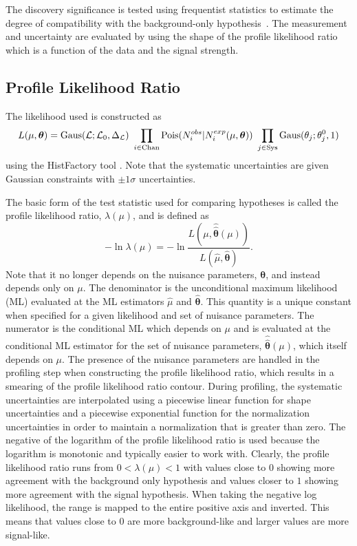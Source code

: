 The discovery significance is tested using frequentist statistics
to estimate the degree of compatibility with the background-only 
hypothesis~\cite{Cowan:1277304}.
The measurement and uncertainty are evaluated 
by using the shape of the profile likelihood ratio~\cite{PDG:2014} 
which is a function of the data and the signal strength.

\subsection{Profile Likelihood Ratio}

The likelihood used is constructed as
\begin{equation}
L(\mu,\boldsymbol{\theta}) = \mathrm{Gaus}(\mathcal{L};\mathcal{L}_0,\Delta_{\mathcal{L}})~\prod_{i\in\mathrm{Chan}} \mathrm{Pois}(N_i^{obs}|N_i^{exp}(\mu,\boldsymbol{\theta}))~\prod_{j\in\mathrm{Sys}} \mathrm{Gaus}(\theta_j;\theta_j^0,1)
\label{eq:poisson_likelihood}
\end{equation}
using the HistFactory tool \cite{Cranmer:1456844}. 
Note that the systematic uncertainties are given Gaussian 
constraints with $\pm1\sigma$ uncertainties.

The basic form of the 
test statistic used for comparing hypotheses is called the profile likelihood 
ratio, $\lambda(\mu)$, and is defined as
\begin{equation}
-\ln \lambda(\mu) = - \ln \frac{L(\mu,\hat{\hat{\boldsymbol{\theta}}}(\mu))}{L(\hat{\mu},\hat{\boldsymbol{\theta}})}.
\label{eq:profile_likelihood_ratio}
\end{equation}
Note that it no longer depends on the nuisance parameters, $\boldsymbol{\theta}$,
and instead depends only on $\mu$. 
The denominator is the 
unconditional maximum likelihood (ML)
evaluated at the ML estimators $\hat{\mu}$ and $\hat{\boldsymbol{\theta}}$.
This quantity is a unique constant when specified for a given likelihood
and set of nuisance parameters.
The numerator is the conditional ML which depends on $\mu$ and
is evaluated at 
the conditional ML estimator for the set of nuisance parameters, 
$\hat{\hat{\boldsymbol{\theta}}}(\mu)$, which itself depends on $\mu$.
The presence of the nuisance parameters are handled in the profiling 
step when constructing the profile likelihood ratio,  which results 
in a smearing of the profile likelihood ratio contour. 
During profiling, the systematic uncertainties are
interpolated using a piecewise linear function for shape uncertainties
and a piecewise exponential function for the normalization uncertainties
in order to maintain a normalization that is greater than zero.
The negative of the logarithm of the profile likelihood 
ratio is used because
the logarithm is monotonic and typically easier to work with.
Clearly, the profile likelihood ratio runs from $0 < \lambda(\mu) < 1$
with values close to $0$ showing more agreement with the background 
only hypothesis and values closer to $1$ showing more agreement with 
the signal hypothesis.
When taking the negative log likelihood, the range
is mapped to the entire positive axis and inverted. This means
that values close to $0$ are more background-like and larger values 
are more signal-like.  

